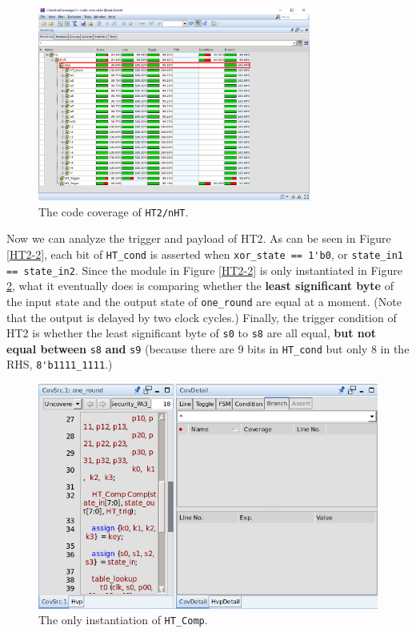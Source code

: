 \documentclass{article}
\begin{document}
\begin{figure}[h] \centering
\includegraphics[width=0.8\textwidth]{nHT2}
\caption{The code coverage of \texttt{HT2/nHT}.}
\label{nHT2}
\end{figure}

Now we can analyze the trigger and payload of HT2. As can be seen in Figure \ref{HT2-2}, each bit of \verb|HT_cond| is asserted when \verb|xor_state == 1'b0|, or \verb|state_in1 == state_in2|. Since the module in Figure \ref{HT2-2} is only instantiated in Figure \ref{HT2-3}, what it eventually does is comparing whether the \textbf{least significant byte} of the input state and the output state of \verb|one_round| are equal at a moment. (Note that the output is delayed by two clock cycles.) Finally, the trigger condition of HT2 is whether the least significant byte of \verb|s0| to \verb|s8| are all equal, \textbf{but not equal between} \verb|s8| \textbf{and} \verb|s9| (because there are 9 bits in \verb|HT_cond| but only 8 in the RHS, \verb|8'b1111_1111|.)

\begin{figure}[h] \centering
\includegraphics[width=\textwidth]{HT2-3}
\caption{The only instantiation of \texttt{HT\_Comp}.}
\label{HT2-3}
\end{figure}
\end{document}

